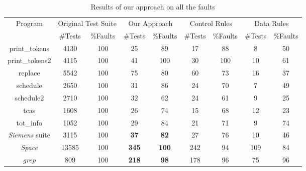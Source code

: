\documentclass{sig-alternate}
\begin{document}
\begin{table}[htbp]
\caption{Results of our approach on all the faults}\label{tab:our}
\center
\begin{tabular}{|c|c|c|c|c|c|c|c|c|}
\hline Program   & \multicolumn{2}{c}{Original Test Suite} \vline & \multicolumn{2}{c}{Our Approach} \vline
& \multicolumn{2}{c}{Control Rules} \vline & \multicolumn{2}{c}{Data Rules} \vline   \\

\cline{2-9}   & \#Tests &   \%Faults & \#Tests &   \%Faults &
\#Tests &   \%Faults & \#Tests &   \%Faults \\
\hline  print\_tokens   &   4130    &   100 &   25  &   89  &   17  &   88  &   8   &   50  \\
\hline  print\_tokens2  &   4115    &   100 &   41  &   100 &   30  &   100 &   10  &   61  \\
\hline  replace &   5542    &   100 &   75  &   80  &   60  &   73  &   16  &   37  \\
\hline  schedule    &   2650    &   100 &   31  &   86  &   24  &   70  &   7   &   49  \\
\hline  schedule2   &   2710    &   100 &   32  &   62  &   24  &   61  &   9   &   25  \\
\hline  tcas    &   1608    &   100 &   26  &   74  &   15  &   68  &   12  &   23  \\
\hline  tot\_info &   1052    &   100 &   29  &   84  &   21  &   71  &   9   &   74  \\
\hline  \emph{Siemens} suite   &   3115    &   100 &   \textbf{37}  &   \textbf{82}  &   27  &   76  &   10  &   46  \\
\hline  \emph{Space}   &   13585   &   100 &   \textbf{345} &   \textbf{100} &   242 &   94  &   109 &   84  \\
\hline  \emph{grep}    &   809 &   100 &   \textbf{218} &   \textbf{98}  &   178 &   96  &   75  &   96  \\

\hline
\end{tabular}
\end{table}
\end{document}
